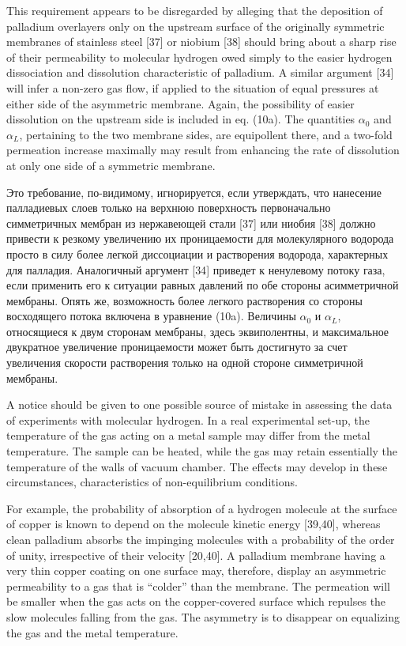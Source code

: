 \documentclass[11pt]{article}
\begin{document}
    This requirement appears to be disregarded by alleging that the
deposition of palladium overlayers only on the upstream surface of the
originally symmetric membranes of stainless steel {[}37{]} or niobium
{[}38{]} should bring about a sharp rise of their permeability to
molecular hydrogen owed simply to the easier hydrogen dissociation and
dissolution characteristic of palladium. A similar argument {[}34{]}
will infer a non-zero gas flow, if applied to the situation of equal
pressures at either side of the asymmetric membrane. Again, the
possibility of easier dissolution on the upstream side is included in
eq. (10a). The quantities \(\alpha_0\) and \(\alpha_L\), pertaining to
the two membrane sides, are equipollent there, and a two-fold permeation
increase maximally may result from enhancing the rate of dissolution at
only one side of a symmetric membrane.

    Это требование, по-видимому, игнорируется, если утверждать, что
нанесение палладиевых слоев только на верхнюю поверхность первоначально
симметричных мембран из нержавеющей стали {[}37{]} или ниобия {[}38{]}
должно привести к резкому увеличению их проницаемости для молекулярного
водорода просто в силу более легкой диссоциации и растворения водорода,
характерных для палладия. Аналогичный аргумент {[}34{]} приведет к
ненулевому потоку газа, если применить его к ситуации равных давлений по
обе стороны асимметричной мембраны. Опять же, возможность более легкого
растворения со стороны восходящего потока включена в уравнение (10a).
Величины \(\alpha_0\) и \(\alpha_L\), относящиеся к двум сторонам
мембраны, здесь эквиполентны, и максимальное двукратное увеличение
проницаемости может быть достигнуто за счет увеличения скорости
растворения только на одной стороне симметричной мембраны.

    A notice should be given to one possible source of mistake in assessing
the data of experiments with molecular hydrogen. In a real experimental
set-up, the temperature of the gas acting on a metal sample may differ
from the metal temperature. The sample can be heated, while the gas may
retain essentially the temperature of the walls of vacuum chamber. The
effects may develop in these circumstances, characteristics of
non-equilibrium conditions.

For example, the probability of absorption of a hydrogen molecule at the
surface of copper is known to depend on the molecule kinetic energy
{[}39,40{]}, whereas clean palladium absorbs the impinging molecules
with a probability of the order of unity, irrespective of their velocity
{[}20,40{]}. A palladium membrane having a very thin copper coating on
one surface may, therefore, display an asymmetric permeability to a gas
that is ``colder'' than the membrane. The permeation will be smaller
when the gas acts on the copper-covered surface which repulses the slow
molecules falling from the gas. The asymmetry is to disappear on
equalizing the gas and the metal temperature.
\end{document}
